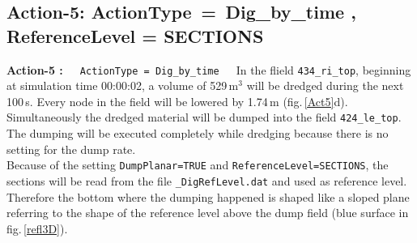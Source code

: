 \subsection{Action-5: ActionType\, = \,Dig\_by\_time , ReferenceLevel = SECTIONS}
\label{ssec:E4Action5}
\textbf{Action-5 :}~~~\texttt{ActionType\,=\,Dig\_by\_time}~~~In the flield \texttt{434\_ri\_top},
beginning at simulation time 00:00:02, a volume of 529\,m$^3$ will be dredged during the next 100\,s.
Every node in the field will be lowered by 1.74\,m (fig.\,\ref{Act5}d).
Simultaneously the dredged material will be dumped into the field \texttt{424\_le\_top}.
The dumping will be executed completely while dredging because there is no setting for the dump rate.
\\Because of the setting \texttt{DumpPlanar=TRUE} and \texttt{ReferenceLevel=SECTIONS}, the
sections will be read from the file \texttt{\_DigRefLevel.dat} and used as reference level.
Therefore the bottom where the dumping happened is shaped like a sloped plane referring to the shape of
the reference level above the dump field (blue surface in fig.\,\ref{refl3D}).
\\
